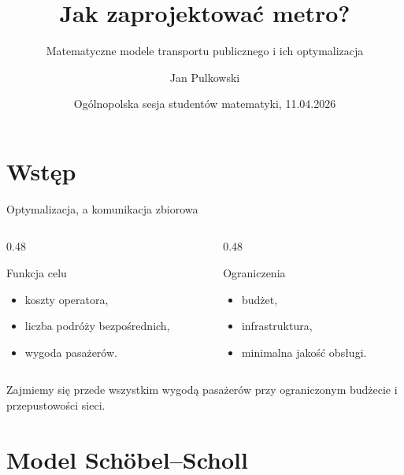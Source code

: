 \documentclass[ignorenonframetext]{beamer}
\title{Jak zaprojektować metro?}
\subtitle{Matematyczne modele transportu publicznego i ich optymalizacja}
\author{Jan Pulkowski}
\institute{Wydział Matematyki i Informatyki -- Uniwersytet Jagielloński}
\date{Ogólnopolska sesja studentów matematyki, 11.04.2026}
\begin{document}
\frame{\titlepage}

\section{Wstęp}

\begin{frame}{Optymalizacja, a komunikacja zbiorowa}
  \begin{columns}[T]
    \begin{column}{0.48\textwidth}
      \begin{block}{Funkcja celu}
        \begin{itemize}
        \item koszty operatora,
        \item liczba podróży bezpośrednich,
        \item wygoda pasażerów.
        \end{itemize}
      \end{block}
    \end{column}
    \begin{column}{0.48\textwidth}
      \begin{block}{Ograniczenia}
        \begin{itemize}
        \item budżet,
        \item infrastruktura,
        \item minimalna jakość obsługi.
        \end{itemize}
      \end{block}
    \end{column}
  \end{columns}
  \vspace{0.3cm}
  Zajmiemy się przede wszystkim wygodą pasażerów przy ograniczonym budżecie i przepustowości sieci.
\end{frame}

\section{Model Schöbel--Scholl}
\end{document}
